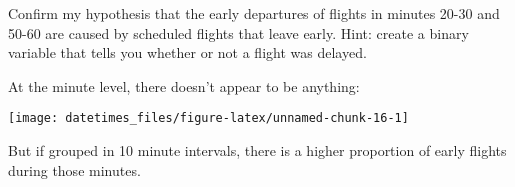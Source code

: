 \documentclass[]{book}
\newenvironment{Shaded}{\begin{snugshade}}{\end{snugshade}}
\newcommand{\DataTypeTok}[1]{\textcolor[rgb]{0.13,0.29,0.53}{#1}}
\newcommand{\DecValTok}[1]{\textcolor[rgb]{0.00,0.00,0.81}{#1}}
\newcommand{\KeywordTok}[1]{\textcolor[rgb]{0.13,0.29,0.53}{\textbf{#1}}}
\newcommand{\NormalTok}[1]{#1}
\newcommand{\OperatorTok}[1]{\textcolor[rgb]{0.81,0.36,0.00}{\textbf{#1}}}
\newcommand{\StringTok}[1]{\textcolor[rgb]{0.31,0.60,0.02}{#1}}
\theoremstyle{plain}
\theoremstyle{remark}
\begin{document}
Confirm my hypothesis that the early departures of flights in minutes
20-30 and 50-60 are caused by scheduled flights that leave early. Hint:
create a binary variable that tells you whether or not a flight was
delayed.

At the minute level, there doesn't appear to be anything:

\begin{Shaded}
\end{Shaded}

\begin{center}\texttt{[image: datetimes\_files/figure-latex/unnamed-chunk-16-1]} \end{center}

But if grouped in 10 minute intervals, there is a higher proportion of
early flights during those minutes.

\begin{Shaded}
\end{Shaded}
\end{document}
